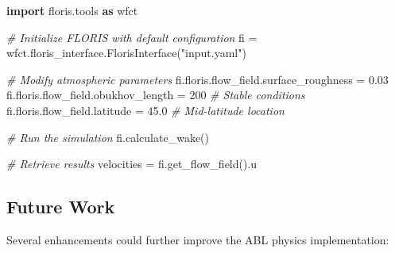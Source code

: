 \documentclass[
]{article}
\newenvironment{Shaded}{}{}
\newcommand{\CommentTok}[1]{\textcolor[rgb]{0.38,0.63,0.69}{\textit{#1}}}
\newcommand{\DecValTok}[1]{\textcolor[rgb]{0.25,0.63,0.44}{#1}}
\newcommand{\FloatTok}[1]{\textcolor[rgb]{0.25,0.63,0.44}{#1}}
\newcommand{\ImportTok}[1]{\textcolor[rgb]{0.00,0.50,0.00}{\textbf{#1}}}
\newcommand{\NormalTok}[1]{#1}
\newcommand{\OperatorTok}[1]{\textcolor[rgb]{0.40,0.40,0.40}{#1}}
\newcommand{\StringTok}[1]{\textcolor[rgb]{0.25,0.44,0.63}{#1}}
\begin{document}
\begin{Shaded}
\begin{Highlighting}[]
\ImportTok{import}\NormalTok{ floris.tools }\ImportTok{as}\NormalTok{ wfct}

\CommentTok{\# Initialize FLORIS with default configuration}
\NormalTok{fi }\OperatorTok{=}\NormalTok{ wfct.floris\_interface.FlorisInterface(}\StringTok{"input.yaml"}\NormalTok{)}

\CommentTok{\# Modify atmospheric parameters}
\NormalTok{fi.floris.flow\_field.surface\_roughness }\OperatorTok{=} \FloatTok{0.03}
\NormalTok{fi.floris.flow\_field.obukhov\_length }\OperatorTok{=} \DecValTok{200}  \CommentTok{\# Stable conditions}
\NormalTok{fi.floris.flow\_field.latitude }\OperatorTok{=} \FloatTok{45.0}       \CommentTok{\# Mid{-}latitude location}

\CommentTok{\# Run the simulation}
\NormalTok{fi.calculate\_wake()}

\CommentTok{\# Retrieve results}
\NormalTok{velocities }\OperatorTok{=}\NormalTok{ fi.get\_flow\_field().u}
\end{Highlighting}
\end{Shaded}

\hypertarget{future-work}{%
\subsection{Future Work}\label{future-work}}

Several enhancements could further improve the ABL physics
implementation:
\end{document}
